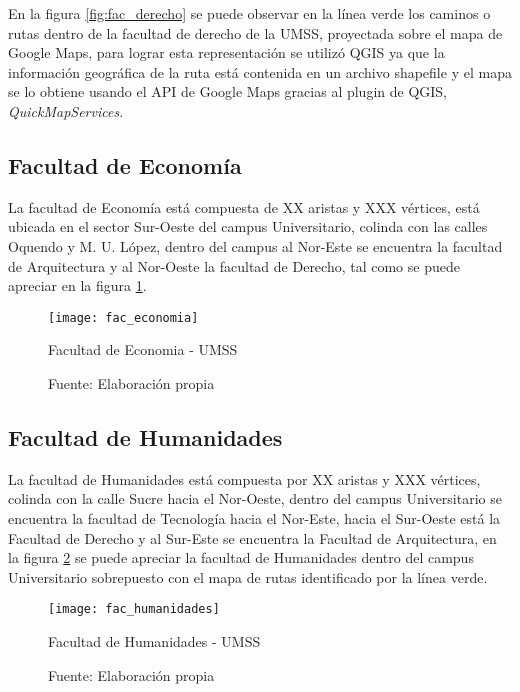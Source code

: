 En la figura \ref{fig:fac_derecho} se puede observar en la línea verde los caminos o rutas dentro de la facultad de derecho de la UMSS, proyectada sobre el mapa de Google Maps, para lograr esta representación se utilizó QGIS ya que la información geográfica de la ruta está contenida en un archivo shapefile y el mapa se lo obtiene usando el API de Google Maps gracias al plugin de QGIS, \emph{QuickMapServices}.



\subsection{Facultad de Economía}
\label{sub:facultad_economia}

La facultad de Economía está compuesta de XX aristas y XXX vértices, está ubicada en el sector Sur-Oeste del campus Universitario, colinda con las calles Oquendo y M. U. López, dentro del campus al Nor-Este se encuentra la facultad de Arquitectura y al Nor-Oeste la facultad de Derecho, tal como se puede apreciar en la figura \ref{fig:fac_economia}.

\begin{figure}[H]
 \begin{center}
   \texttt{[image: fac\_economia]}
   \caption{Facultad de Economia - UMSS}
   \label{fig:fac_economia}
   \caption*{Fuente: Elaboración propia}
 \end{center}
\end{figure}



\subsection{Facultad de Humanidades}
\label{sub:facultad_humanidades}

La facultad de Humanidades está compuesta por XX aristas y XXX vértices, colinda con la calle Sucre hacia el Nor-Oeste, dentro del campus Universitario se encuentra la facultad de Tecnología hacia el Nor-Este, hacia el Sur-Oeste está la Facultad de Derecho y al Sur-Este se encuentra la Facultad de Arquitectura, en la figura \ref{fig:fac_humanidades} se puede apreciar la facultad de Humanidades dentro del campus Universitario sobrepuesto con el mapa de rutas identificado por la línea verde.

\begin{figure}[H]
 \begin{center}
   \texttt{[image: fac\_humanidades]}
   \caption{Facultad de Humanidades - UMSS}
   \label{fig:fac_humanidades}
   \caption*{Fuente: Elaboración propia}
 \end{center}
\end{figure}


